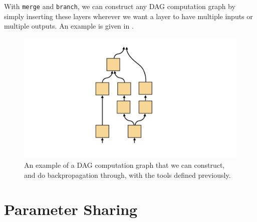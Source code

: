 With \texttt{merge} and \texttt{branch}, we can construct any DAG computation graph by simply inserting these layers wherever we want a layer to have multiple inputs or multiple outputs. An example is given in \fig{\ref{fig:backpropagation:backprop_DAG}}.
\begin{figure}[h]
    \centerline{
        \includegraphics[width=0.25\linewidth, angle=-90]{./figures/backpropagation/DAG.pdf}
    }
    \caption{An example of a DAG computation graph that we can construct, and do backpropagation through, with the tools defined previously.}
    \label{fig:backpropagation:backprop_DAG}
\end{figure}

\section{Parameter Sharing}

